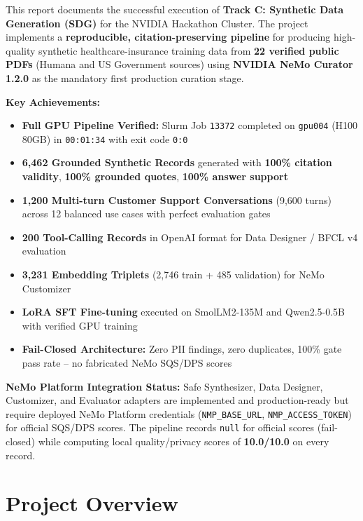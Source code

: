\documentclass[11pt,a4paper]{article}
\begin{document}
\begin{nvidiabox}
This report documents the successful execution of \textbf{Track C: Synthetic Data Generation (SDG)} for the NVIDIA Hackathon Cluster. The project implements a \textbf{reproducible, citation-preserving pipeline} for producing high-quality synthetic healthcare-insurance training data from \textbf{22 verified public PDFs} (Humana and US Government sources) using \textbf{NVIDIA NeMo Curator 1.2.0} as the mandatory first production curation stage.

\medskip
\noindent\textbf{Key Achievements:}
\begin{itemize}[label=\textcolor{nvidiaGreen}{$\bullet$}, leftmargin=*]
    \item \textbf{Full GPU Pipeline Verified:} Slurm Job \texttt{13372} completed on \texttt{gpu004} (H100 80GB) in \texttt{00:01:34} with exit code \texttt{0:0}
    \item \textbf{6,462 Grounded Synthetic Records} generated with \textbf{100\% citation validity}, \textbf{100\% grounded quotes}, \textbf{100\% answer support}
    \item \textbf{1,200 Multi-turn Customer Support Conversations} (9,600 turns) across 12 balanced use cases with perfect evaluation gates
    \item \textbf{200 Tool-Calling Records} in OpenAI format for Data Designer / BFCL v4 evaluation
    \item \textbf{3,231 Embedding Triplets} (2,746 train + 485 validation) for NeMo Customizer
    \item \textbf{LoRA SFT Fine-tuning} executed on SmolLM2-135M and Qwen2.5-0.5B with verified GPU training
    \item \textbf{Fail-Closed Architecture:} Zero PII findings, zero duplicates, 100\% gate pass rate -- no fabricated NeMo SQS/DPS scores
\end{itemize}

\medskip
\noindent\textbf{NeMo Platform Integration Status:} Safe Synthesizer, Data Designer, Customizer, and Evaluator adapters are implemented and production-ready but require deployed NeMo Platform credentials (\texttt{NMP\_BASE\_URL}, \texttt{NMP\_ACCESS\_TOKEN}) for official SQS/DPS scores. The pipeline records \texttt{null} for official scores (fail-closed) while computing local quality/privacy scores of \textbf{10.0/10.0} on every record.
\end{nvidiabox}

\section{Project Overview}
\label{sec:overview}
\end{document}
